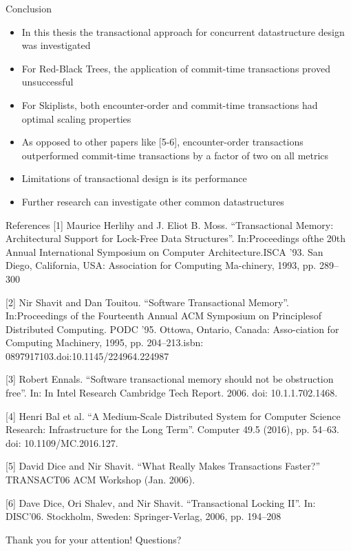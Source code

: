 \begin{frame}{Conclusion}
    \begin{itemize}
        \item In this thesis the transactional approach for concurrent datastructure design was investigated
        \item For Red-Black Trees, the application of commit-time transactions proved unsuccessful
        \item For Skiplists, both encounter-order and commit-time transactions had optimal scaling properties
        \item As opposed to other papers like [5-6], encounter-order transactions outperformed commit-time transactions by a factor of two on all metrics
        \item Limitations of transactional design is its performance
        \item Further research can investigate other common datastructures
    \end{itemize}
\end{frame}

\begin{frame}{References}
\tiny{[1] Maurice  Herlihy  and  J.  Eliot  B.  Moss.  “Transactional  Memory:  Architectural Support for Lock-Free Data Structures”. In:Proceedings ofthe  20th  Annual  International  Symposium  on  Computer  Architecture.ISCA ’93. San Diego, California, USA: Association for Computing Ma-chinery, 1993, pp. 289–300\\}

\vspace{0.3cm}

\tiny{[2] Nir  Shavit  and  Dan  Touitou.  “Software  Transactional  Memory”.  In:Proceedings  of  the  Fourteenth  Annual  ACM  Symposium  on  Principlesof Distributed Computing. PODC ’95. Ottowa, Ontario, Canada: Asso-ciation for Computing Machinery, 1995, pp. 204–213.isbn: 0897917103.doi:10.1145/224964.224987\\}

\vspace{0.3cm}

\tiny{[3] Robert Ennals. “Software transactional memory should not be obstruction free”. In: In Intel Research Cambridge Tech Report. 2006. doi: 10.1.1.702.1468.}

\vspace{0.3cm}

\tiny{[4] Henri Bal et al. “A Medium-Scale Distributed System for Computer Science Research: Infrastructure for the Long Term”. Computer 49.5 (2016), pp. 54–63. doi: 10.1109/MC.2016.127.}

\vspace{0.3cm}

\tiny{[5] David Dice and Nir Shavit. “What Really Makes Transactions Faster?” TRANSACT06 ACM Workshop (Jan. 2006).}

\vspace{0.3cm}

\tiny{[6] Dave Dice, Ori Shalev, and Nir Shavit. “Transactional Locking II”. In: DISC’06. Stockholm, Sweden: Springer-Verlag, 2006, pp. 194–208}
\end{frame}

\begin{frame}{Thank you for your attention!}
Questions?
\end{frame}